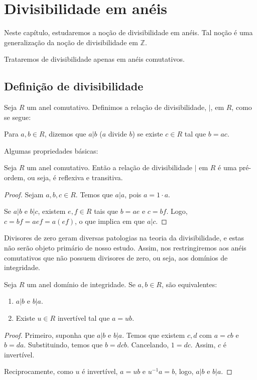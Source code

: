 \chapter{Divisibilidade em anéis}
Neste capítulo, estudaremos a noção de divisibilidade em anéis.
Tal noção é uma generalização da noção de divisibilidade em $\mathbb Z$.

Trataremos de divisibilidade apenas em anéis comutativos.

\section{Definição de divisibilidade}


\begin{definition}
Seja $R$ um anel comutativo. Definimos a relação de divisibilidade, $|$, em $R$, como se segue:

Para $a, b \in R$, dizemos que $a|b$ ($a$ divide $b$) se existe $c \in R$ tal que $b=ac$.
\end{definition}
Algumas propriedades básicas:
\begin{prop}
    Seja $R$ um anel comutativo.
    Então a relação de divisibilidade $|$ em $R$ é uma pré-ordem, ou seja, é reflexiva e transitiva.
\end{prop}

\begin{proof}Sejam $a, b, c \in R$.
    Temos que $a|a$, pois $a=1\cdot a$.

    Se $a|b$ e $b|c$, existem $e, f \in R$ tais que $b=ae$ e $c=bf$.
    Logo, $c=bf=aef=a(ef)$, o que implica em que $a|c$.
\end{proof}

Divisores de zero geram diversas patologias na teoria da divisibilidade, e estas não serão objeto primário de nosso estudo.
Assim, nos restringiremos aos anéis comutativos que não possuem divisores de zero, ou seja, aos domínios de integridade.
\begin{prop}
    Seja $R$ um anel domínio de integridade. Se $a, b\in R$, são equivalentes:

    \begin{enumerate}
        \item $a|b$ e $b|a$.
        \item Existe $u \in R$ invertível tal que $a=ub$.
    \end{enumerate}

    \begin{proof}
        Primeiro, suponha que $a|b$ e $b|a$.
        Temos que existem $c, d$ com $a=cb$ e $b=da$.
        Substituindo, temos que $b=dcb$. Cancelando, $1=dc$. Assim, $c$ é invertível.

        Reciprocamente, como $u$ é invertível, $a=ub$ e $u^{-1}a=b$, logo, $a|b$ e $b|a$.
    \end{proof}
\end{prop}

